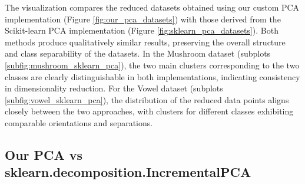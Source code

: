 The visualization compares the reduced datasets obtained using our custom PCA implementation (Figure \ref{fig:our_pca_datasets}) 
with those derived from the Scikit-learn PCA implementation (Figure \ref{fig:sklearn_pca_datasets}).
Both methods produce qualitatively similar results, preserving the overall structure and class separability of the datasets.
In the Mushroom dataset (subplots \ref{subfig:mushroom_sklearn_pca}), the two main clusters corresponding to the two classes are clearly distinguishable in both implementations,
indicating consistency in dimensionality reduction. For the Vowel dataset (subplots \ref{subfig:vowel_sklearn_pca}),
the distribution of the reduced data points aligns closely between the two approaches, with clusters for different classes exhibiting comparable orientations and separations.








\subsection{Our PCA vs sklearn.decomposition.IncrementalPCA}
\label{subsec:pca-vs-incremental-pca}


